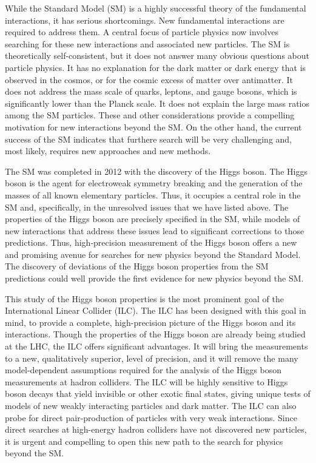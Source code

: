 
While the Standard Model (SM) is a highly successful theory of
the fundamental interactions, it has serious shortcomings. New
fundamental interactions are 
required to address them.   A central focus of particle physics
now involves
searching for these new interactions and associated new particles.  
The SM is theoretically
 self-consistent, but it does not answer many obvious questions about
 particle physics.  It has no explanation for the 
dark matter or dark energy
that is observed in the cosmos,
or for  the cosmic excess of matter over antimatter.   It does
not address the mass scale of quarks, leptons, and gauge 
bosons, which is significantly lower than the Planck scale.   
It does not explain
the large mass ratios among the SM particles.   
These and other considerations provide a compelling motivation
for new interactions beyond the SM.   On the other hand,
the current success of the SM indicates  that furthere search will be
very challenging and, most likely, requires new approaches and new methods.

The SM was completed in 2012 with the discovery of the Higgs boson.
The Higgs boson is the agent for  electroweak symmetry breaking
and the generation of the masses of all known elementary
particles.  Thus, it occupies a central role in the SM and,
specifically, in the unresolved issues that we have listed above. 
 The properties of the Higgs boson are precisely specified
in the SM, while models of new interactions that address these issues
lead to
significant corrections to those predictions.  Thus, high-precision
measurement of the Higgs boson offers a new and promising 
 avenue for searches for
new physics beyond the Standard Model.   The discovery of deviations
of the Higgs boson properties from the SM predictions could well
provide the first evidence for new physics beyond the SM. 
 
This study of the Higgs boson properties is the most prominent goal of
the International Linear Collider (ILC).   The ILC has been designed
with this goal in mind, to provide a complete, high-precision picture
of the Higgs boson and its interactions.  Though the properties of the
Higgs boson are already being studied at the LHC, the ILC offers
significant advantages.  It will bring the measurements
to a new, qualitatively superior, level of precision, and it will
remove the many model-dependent assumptions required for the analysis
of the Higgs boson measurements at hadron colliders.   The ILC will be highly
sensitive to Higgs boson decays that yield invisible or
other exotic final states, giving unique tests of models of new weakly
interacting particles and dark matter. The ILC can also probe for
direct pair-production of particles with very weak interactions.  Since direct searches
at high-energy hadron colliders have not discovered new particles, it
is urgent and compelling to open this new path to the search for
physics beyond the SM.

